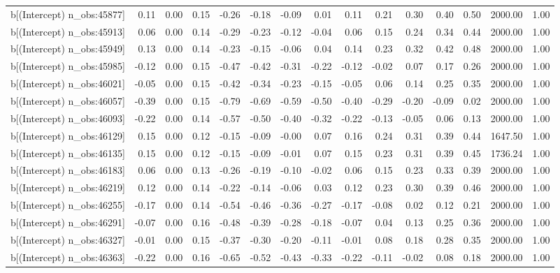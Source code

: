 \begin{table}[ht]
\begin{tabular}{rrrrrrrrrrrrrrr}
  b[(Intercept) n\_obs:45877] & 0.11 & 0.00 & 0.15 & -0.26 & -0.18 & -0.09 & 0.01 & 0.11 & 0.21 & 0.30 & 0.40 & 0.50 & 2000.00 & 1.00 \\ 
  b[(Intercept) n\_obs:45913] & 0.06 & 0.00 & 0.14 & -0.29 & -0.23 & -0.12 & -0.04 & 0.06 & 0.15 & 0.24 & 0.34 & 0.44 & 2000.00 & 1.00 \\ 
  b[(Intercept) n\_obs:45949] & 0.13 & 0.00 & 0.14 & -0.23 & -0.15 & -0.06 & 0.04 & 0.14 & 0.23 & 0.32 & 0.42 & 0.48 & 2000.00 & 1.00 \\ 
  b[(Intercept) n\_obs:45985] & -0.12 & 0.00 & 0.15 & -0.47 & -0.42 & -0.31 & -0.22 & -0.12 & -0.02 & 0.07 & 0.17 & 0.26 & 2000.00 & 1.00 \\ 
  b[(Intercept) n\_obs:46021] & -0.05 & 0.00 & 0.15 & -0.42 & -0.34 & -0.23 & -0.15 & -0.05 & 0.06 & 0.14 & 0.25 & 0.35 & 2000.00 & 1.00 \\ 
  b[(Intercept) n\_obs:46057] & -0.39 & 0.00 & 0.15 & -0.79 & -0.69 & -0.59 & -0.50 & -0.40 & -0.29 & -0.20 & -0.09 & 0.02 & 2000.00 & 1.00 \\ 
  b[(Intercept) n\_obs:46093] & -0.22 & 0.00 & 0.14 & -0.57 & -0.50 & -0.40 & -0.32 & -0.22 & -0.13 & -0.05 & 0.06 & 0.13 & 2000.00 & 1.00 \\ 
  b[(Intercept) n\_obs:46129] & 0.15 & 0.00 & 0.12 & -0.15 & -0.09 & -0.00 & 0.07 & 0.16 & 0.24 & 0.31 & 0.39 & 0.44 & 1647.50 & 1.00 \\ 
  b[(Intercept) n\_obs:46135] & 0.15 & 0.00 & 0.12 & -0.15 & -0.09 & -0.01 & 0.07 & 0.15 & 0.23 & 0.31 & 0.39 & 0.45 & 1736.24 & 1.00 \\ 
  b[(Intercept) n\_obs:46183] & 0.06 & 0.00 & 0.13 & -0.26 & -0.19 & -0.10 & -0.02 & 0.06 & 0.15 & 0.23 & 0.33 & 0.39 & 2000.00 & 1.00 \\ 
  b[(Intercept) n\_obs:46219] & 0.12 & 0.00 & 0.14 & -0.22 & -0.14 & -0.06 & 0.03 & 0.12 & 0.23 & 0.30 & 0.39 & 0.46 & 2000.00 & 1.00 \\ 
  b[(Intercept) n\_obs:46255] & -0.17 & 0.00 & 0.14 & -0.54 & -0.46 & -0.36 & -0.27 & -0.17 & -0.08 & 0.02 & 0.12 & 0.21 & 2000.00 & 1.00 \\ 
  b[(Intercept) n\_obs:46291] & -0.07 & 0.00 & 0.16 & -0.48 & -0.39 & -0.28 & -0.18 & -0.07 & 0.04 & 0.13 & 0.25 & 0.36 & 2000.00 & 1.00 \\ 
  b[(Intercept) n\_obs:46327] & -0.01 & 0.00 & 0.15 & -0.37 & -0.30 & -0.20 & -0.11 & -0.01 & 0.08 & 0.18 & 0.28 & 0.35 & 2000.00 & 1.00 \\ 
  b[(Intercept) n\_obs:46363] & -0.22 & 0.00 & 0.16 & -0.65 & -0.52 & -0.43 & -0.33 & -0.22 & -0.11 & -0.02 & 0.08 & 0.18 & 2000.00 & 1.00 \\ 

\end{tabular}
\end{table}
